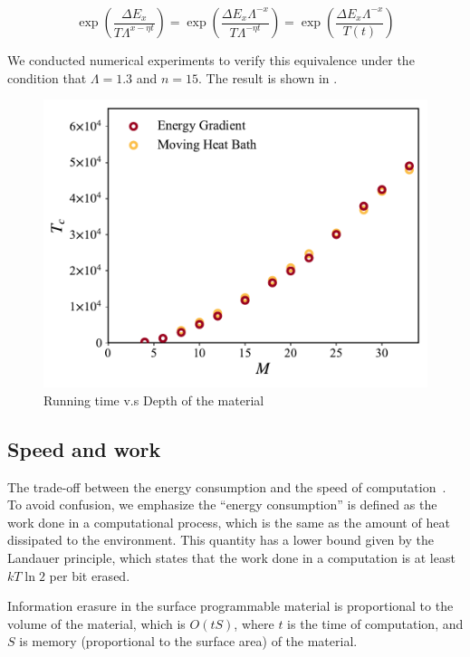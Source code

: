 \documentclass[twocolumn,superscriptaddress,english,showpacs,longbibliography]{revtex4-2}
\begin{document}
\begin{equation}
    \exp\left({\frac{\Delta E_x}{T\Lambda^{x-\eta t}}}\right) = \exp\left({\frac{\Delta E_x\Lambda^{-x}}{T\Lambda^{-\eta t}}}\right) = \exp\left({\frac{\Delta E_x \Lambda^{-x}}{T(t)}}\right)
\end{equation}

We conducted numerical experiments to verify this equivalence under the condition
that $\Lambda = 1.3$ and $n=15$. The result is shown in .
\begin{figure}[h]
    \centering
    \includegraphics[width=\columnwidth,keepaspectratio]{../notes/images/EGvsMHB.pdf}
    \caption{Running time v.s Depth of the material}
    \label{EGvsMHB}
\end{figure}

\subsection{Speed and work}\label{speed-and-work}

The trade-off between the energy consumption and the speed of
computation~\cite{Feynman2018}. To avoid confusion, we emphasize the
``energy consumption'' is defined as the work done in a computational
process, which is the same as the amount of heat dissipated to the
environment. This quantity has a lower bound given by the Landauer
principle, which states that the work done in a computation is at least
$kT\ln 2$ per bit erased\cite{Reeb2014}.

Information erasure in the surface programmable material is proportional
to the volume of the material, which is $O(tS)$, where $t$ is the
time of computation, and $S$ is memory (proportional to the surface
area) of the material.
\end{document}
